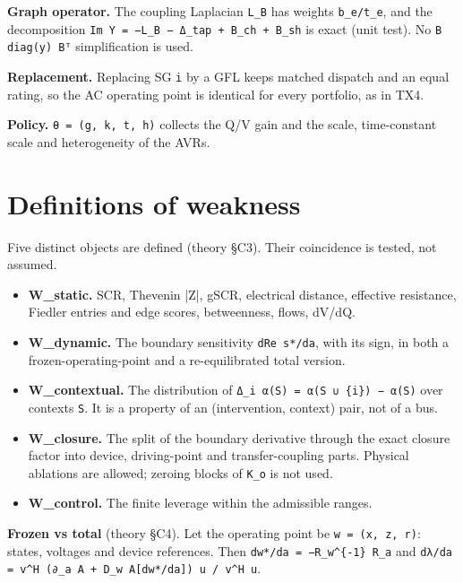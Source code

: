 \documentclass[10pt,a4paper]{article}
\begin{document}
\textbf{Graph operator.} The coupling Laplacian \texttt{L\_\allowbreak{}B} has weights \texttt{b\_\allowbreak{}e/\allowbreak{}t\_\allowbreak{}e}, and the decomposition \texttt{Im Y =\allowbreak{} −L\_\allowbreak{}B − Δ\_\allowbreak{}tap + B\_\allowbreak{}ch + B\_\allowbreak{}sh} is exact (unit test). No \texttt{B diag(y) Bᵀ} simplification is used.

\textbf{Replacement.} Replacing SG \texttt{i} by a GFL keeps matched dispatch and an equal rating, so the AC operating point is identical for every portfolio, as in TX4.

\textbf{Policy.} \texttt{θ =\allowbreak{} (g, k, t, h)} collects the Q/V gain and the scale, time-constant scale and heterogeneity of the AVRs.

\section{Definitions of weakness}
Five distinct objects are defined (theory §C3). Their coincidence is tested, not assumed.

\begin{itemize}
\item \textbf{W\_static.} SCR, Thevenin |Z|, gSCR, electrical distance, effective resistance, Fiedler entries and edge scores, betweenness, flows, dV/dQ.
\item \textbf{W\_dynamic.} The boundary sensitivity \texttt{dRe s*/\allowbreak{}da}, with its sign, in both a frozen-operating-point and a re-equilibrated total version.
\item \textbf{W\_contextual.} The distribution of \texttt{Δ\_\allowbreak{}i α(S) =\allowbreak{} α(S ∪ \{i\}) − α(S)} over contexts \texttt{S}. It is a property of an (intervention, context) pair, not of a bus.
\item \textbf{W\_closure.} The split of the boundary derivative through the exact closure factor into device, driving-point and transfer-coupling parts. Physical ablations are allowed; zeroing blocks of \texttt{K\_\allowbreak{}o} is not used.
\item \textbf{W\_control.} The finite leverage within the admissible ranges.
\end{itemize}
\textbf{Frozen vs total} (theory §C4). Let the operating point be \texttt{w =\allowbreak{} (x, z, r)}: states, voltages and device references. Then \texttt{dw*/\allowbreak{}da =\allowbreak{} −R\_\allowbreak{}w\textasciicircum{}\{-1\} R\_\allowbreak{}a} and \texttt{dλ/\allowbreak{}da =\allowbreak{} v\textasciicircum{}H (∂\_\allowbreak{}a A + D\_\allowbreak{}w A[dw*/\allowbreak{}da]) u /\allowbreak{} v\textasciicircum{}H u}.
\end{document}
